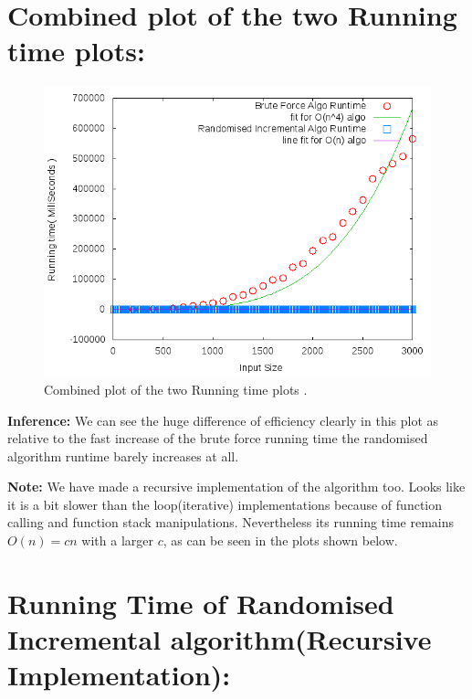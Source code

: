 \documentclass{article}
\begin{document}
\section*{Combined plot of the two Running time plots:}
\begin{figure}[th]%
\centering
\includegraphics{combine_loop1.png}%
\hfill
\caption{Combined plot of the two Running time plots .}
\label{fig:proto}%
\end{figure}
\textbf{Inference:} We can see the huge difference of efficiency clearly in this plot as relative to the fast increase of the brute force running time the randomised algorithm runtime barely increases at all.
\newpage

\textbf{Note:} We have made a recursive implementation of the algorithm too. Looks like it is a bit slower than the loop(iterative) implementations because of function calling and function stack manipulations. Nevertheless its running time remains $O(n) = cn$ with a larger $c$, as can be seen in the plots shown below.

\section*{Running Time of Randomised Incremental algorithm(Recursive Implementation):}
\end{document}
